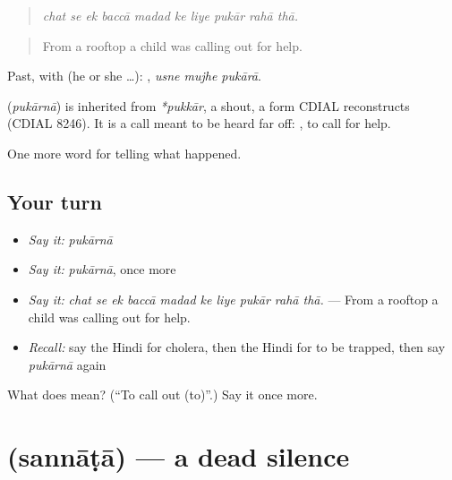 \begin{quote}
         
\end{quote}

\begin{quote}
\emph{chat se ek baccā madad ke liye pukār rahā thā.}
\end{quote}

\begin{quote}
From a rooftop a child was calling out for help.
\end{quote}

Past, with  (he or she …):   , \emph{usne mujhe pukārā}.

\begin{cousinweb}
\textbf{} (\emph{pukārnā}) is inherited from \emph{*pukkār}, a shout, a form CDIAL reconstructs (CDIAL 8246). It is a call meant to be heard far off: \textbf{   }, to call for help.
\end{cousinweb}

\begin{grammarlens}[title={What you've built}]
One more word for telling what happened.
\end{grammarlens}

\subsection*{Your turn}
\begin{itemize}
\raggedright
  \item \emph{Say it:} \emph{pukārnā}
  \item \emph{Say it:} \emph{pukārnā}, once more
  \item \emph{Say it:} \emph{chat se ek baccā madad ke liye pukār rahā thā.} — From a rooftop a child was calling out for help.
  \item \emph{Recall:} say the Hindi for cholera, then the Hindi for to be trapped, then say \emph{pukārnā} again
\end{itemize}

\begin{tcolorbox}[breakable,colback=teal!4,colframe=teal!35!black,title={Before you move on}]
What does  mean? (\textquotedblleft{}To call out (to)\textquotedblright{}.) Say it once more.
\end{tcolorbox}
\section[\texorpdfstring{\hi{सन्नाटा} (sannāṭā)}{सन्नाटा (sannāṭā)}]{ (sannāṭā) — a dead silence}

